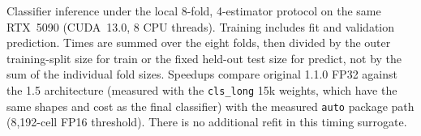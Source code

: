 \documentclass[11pt]{article}
\begin{document}
\begin{table}[tbp]
\centering
\footnotesize
\setlength{\tabcolsep}{3.5pt}
\resizebox{\linewidth}{!}{}
\caption{Classifier inference under the local 8-fold, 4-estimator protocol on the same RTX~5090 (CUDA~13.0, 8 CPU threads). Training includes fit and validation prediction. Times are summed over the eight folds, then divided by the outer training-split size for train or the fixed held-out test size for predict, not by the sum of the individual fold sizes. Speedups compare original 1.1.0 FP32 against the 1.5 architecture (measured with the \texttt{cls\_long} 15k weights, which have the same shapes and cost as the final classifier) with the measured \texttt{auto} package path (8,192-cell FP16 threshold). There is no additional refit in this timing surrogate.}
\label{tab:speed}
\end{table}
\end{document}
